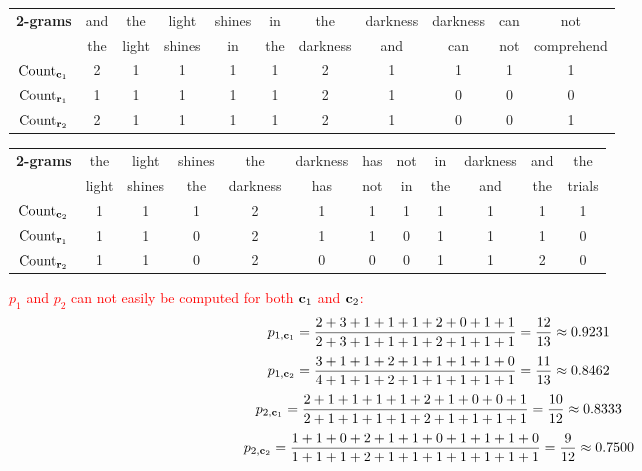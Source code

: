 \begin{parts}
\begin{subparts}
\begin{table}[h!]
\centering
{\color{red}\begin{tabular}{|c|c|c|c|c|c|c|c|c|c|c|} 
 \hline
 \multirow{2}{*}{\textbf{2-grams}} & and & the & light & shines & in & the & darkness & darkness & can & not \\
 & the & light & shines & in & the & darkness & and & can & not & comprehend\\ [0.5ex] 
 \hline
 $\text{Count}_{\mathbf{c}_1}$ & 2 & 1 & 1 & 1 & 1 & 2 & 1 & 1 & 1 & 1\\  
 $\text{Count}_{\mathbf{r}_1}$ & 1 & 1 & 1 & 1 & 1 & 2 & 1 & 0 & 0 & 0\\
 $\text{Count}_{\mathbf{r}_2}$ & 2 & 1 & 1 & 1 & 1 & 2 & 1 & 0 & 0 & 1\\ [1ex] 
 \hline
\end{tabular}}
\label{table:1}
\end{table}

\begin{table}[h!]
\centering
{\color{red}\begin{tabular}{|c|c|c|c|c|c|c|c|c|c|c|c|} 
 \hline
 \multirow{2}{*}{\textbf{2-grams}} & the & light & shines & the & darkness & has & not & in & darkness & and & the\\
& light & shines & the & darkness & has & not & in & the & and & the & trials\\ [0.5ex] 
 \hline
 $\text{Count}_{\mathbf{c}_2}$ & 1 & 1 & 1 & 2 & 1 & 1 & 1 & 1 & 1 & 1 & 1\\  
 $\text{Count}_{\mathbf{r}_1}$ & 1 & 1 & 0 & 2 & 1 & 1 & 0 & 1 & 1 & 1 & 0\\
 $\text{Count}_{\mathbf{r}_2}$ & 1 & 1 & 0 & 2 & 0 & 0 & 0 & 1 & 1 & 2 & 0\\ [1ex] 
 \hline
\end{tabular}}
\label{table:1}
\end{table}

\textcolor{red}{$p_1$ and $p_2$ can not easily be computed for both $\mathbf{c}_1$ and $\mathbf{c}_2$:
\[
p_{1,\mathbf{c}_1} = \frac{2+3+1+1+1+2+0+1+1}{2 + 3 + 1 + 1 + 1 + 2 + 1 + 1 + 1} = \frac{12}{13} \approx 0.9231
\]
\[
p_{1,\mathbf{c}_2} = \frac{3+1+1+2+1+1+1+1+0}{4 + 1 + 1 + 2 + 1 + 1 + 1 + 1 + 1} = \frac{11}{13} \approx 0.8462
\]
\[
p_{2,\mathbf{c}_1} = \frac{2+1+1+1+1+2+1+0+0+1}{2 + 1 + 1 + 1 + 1 + 2 + 1 + 1 + 1 + 1} = \frac{10}{12} \approx 0.8333
\]
\[
p_{2,\mathbf{c}_2} = \frac{1+1+0+2+1+1+0+1+1+1+0}{1 + 1 + 1 + 2 + 1 + 1 + 1 + 1 + 1 + 1 + 1} = \frac{9}{12} \approx 0.7500
\]}


\end{subparts}
\end{parts}
